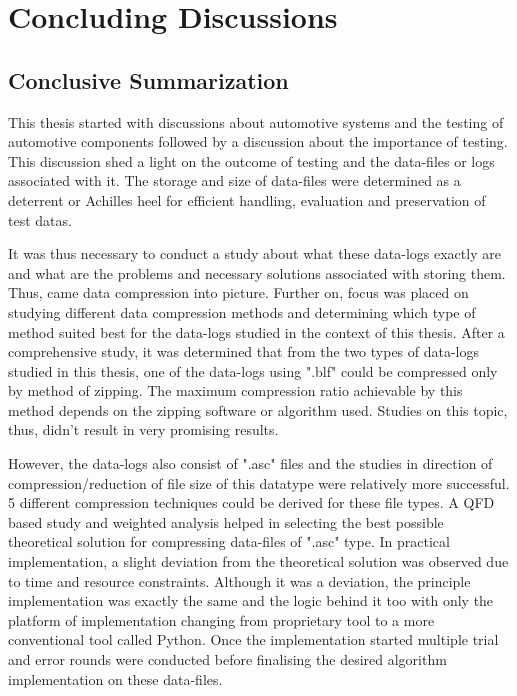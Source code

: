 \section{Concluding Discussions} 

\subsection{Conclusive Summarization} 
This thesis started with discussions about automotive systems and the testing of automotive components followed by a discussion about the importance of testing. This discussion shed a light on the outcome of testing and the data-files or logs associated with it. The storage and size of data-files were determined as a deterrent or Achilles heel for efficient handling, evaluation and preservation of test datas. 

It was thus necessary to conduct a study about what these data-logs exactly are and what are the problems and necessary solutions associated with storing them. Thus, came data compression into picture. Further on, focus was placed on studying different data compression methods and determining which type of method suited best for the data-logs studied in the context of this thesis. After a comprehensive study, it was determined that from the two types of data-logs studied in this thesis, one of the data-logs using ".blf" could be compressed only by method of zipping. The maximum compression ratio achievable by this method depends on the zipping software or algorithm used. Studies on this topic, thus, didn't result in very promising results.

However, the data-logs also consist of ".asc" files and the studies in direction of compression/reduction of file size of this datatype were relatively more successful. 5 different compression techniques could be derived for these file types. A QFD based study and weighted analysis helped in selecting the best possible theoretical solution for compressing data-files of ".asc" type. In practical implementation, a slight deviation from the theoretical solution was observed due to time and resource constraints. Although it was a deviation, the principle implementation was exactly the same and the logic behind it too with only the platform of implementation changing from proprietary tool to a more conventional tool called Python. Once the implementation started multiple trial and error rounds were conducted before finalising the desired algorithm implementation on these data-files.

